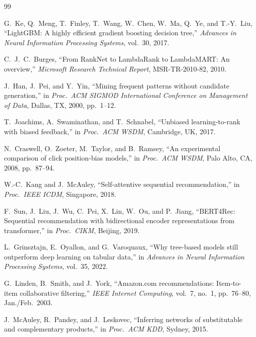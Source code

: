 \documentclass[conference]{IEEEtran}
\begin{document}
\begin{thebibliography}{99}

G.\ Ke, Q.\ Meng, T.\ Finley, T.\ Wang, W.\ Chen, W.\ Ma, Q.\ Ye, and
T.-Y.\ Liu, ``LightGBM: A highly efficient gradient boosting decision tree,''
\textit{Advances in Neural Information Processing Systems}, vol.\ 30, 2017.

C.\ J.\ C.\ Burges, ``From RankNet to LambdaRank to LambdaMART: An overview,''
\textit{Microsoft Research Technical Report}, MSR-TR-2010-82, 2010.

J.\ Han, J.\ Pei, and Y.\ Yin, ``Mining frequent patterns without candidate
generation,'' in \textit{Proc.\ ACM SIGMOD International Conference on
Management of Data}, Dallas, TX, 2000, pp.\ 1--12.

T.\ Joachims, A.\ Swaminathan, and T.\ Schnabel, ``Unbiased learning-to-rank
with biased feedback,'' in \textit{Proc.\ ACM WSDM}, Cambridge, UK, 2017.

N.\ Craswell, O.\ Zoeter, M.\ Taylor, and B.\ Ramsey, ``An experimental
comparison of click position-bias models,'' in \textit{Proc.\ ACM WSDM},
Palo Alto, CA, 2008, pp.\ 87--94.

W.-C.\ Kang and J.\ McAuley, ``Self-attentive sequential recommendation,''
in \textit{Proc.\ IEEE ICDM}, Singapore, 2018.

F.\ Sun, J.\ Liu, J.\ Wu, C.\ Pei, X.\ Lin, W.\ Ou, and P.\ Jiang,
``BERT4Rec: Sequential recommendation with bidirectional encoder
representations from transformer,'' in \textit{Proc.\ CIKM}, Beijing, 2019.

L.\ Grinsztajn, E.\ Oyallon, and G.\ Varoquaux, ``Why tree-based models still
outperform deep learning on tabular data,'' in \textit{Advances in Neural
Information Processing Systems}, vol.\ 35, 2022.

G.\ Linden, B.\ Smith, and J.\ York, ``Amazon.com recommendations:
Item-to-item collaborative filtering,'' \textit{IEEE Internet Computing},
vol.\ 7, no.\ 1, pp.\ 76--80, Jan./Feb.\ 2003.

J.\ McAuley, R.\ Pandey, and J.\ Leskovec, ``Inferring networks of substitutable
and complementary products,'' in \textit{Proc.\ ACM KDD}, Sydney, 2015.


\end{thebibliography}
\end{document}
